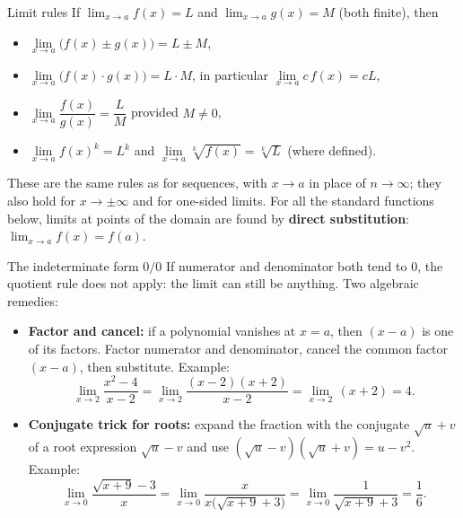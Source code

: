 \begin{rulebox}{Limit rules}
If $\lim_{x\to a}f(x)=L$ and $\lim_{x\to a}g(x)=M$ (both finite), then
\begin{itemize}[leftmargin=1.6em,itemsep=0.3ex]
  \item $\lim\limits_{x\to a}\bigl(f(x)\pm g(x)\bigr)=L\pm M$,
  \item $\lim\limits_{x\to a}\bigl(f(x)\cdot g(x)\bigr)=L\cdot M$,
        \quad in particular $\lim\limits_{x\to a}c\,f(x)=cL$,
  \item $\lim\limits_{x\to a}\dfrac{f(x)}{g(x)}=\dfrac{L}{M}$ \quad
        provided $M\neq 0$,
  \item $\lim\limits_{x\to a}f(x)^{k}=L^{k}$ and
        $\lim\limits_{x\to a}\sqrt[k]{f(x)}=\sqrt[k]{L}$ (where defined).
\end{itemize}
These are the same rules as for sequences, with $x\to a$ in place of
$n\to\infty$; they also hold for $x\to\pm\infty$ and for one-sided limits.
For all the standard functions below, limits at points of the domain are
found by \textbf{direct substitution}: $\lim_{x\to a}f(x)=f(a)$.
\end{rulebox}

\begin{rulebox}{The indeterminate form $0/0$}
If numerator and denominator both tend to $0$, the quotient rule does not
apply: the limit can still be anything. Two algebraic remedies:
\begin{itemize}[leftmargin=1.6em,itemsep=0.3ex]
  \item \textbf{Factor and cancel:} if a polynomial vanishes at $x=a$,
        then $(x-a)$ is one of its factors. Factor numerator and
        denominator, cancel the common factor $(x-a)$, then substitute.
        Example:
        \[
          \lim_{x\to 2}\frac{x^{2}-4}{x-2}
          =\lim_{x\to 2}\frac{(x-2)(x+2)}{x-2}
          =\lim_{x\to 2}\,(x+2)=4 .
        \]
  \item \textbf{Conjugate trick for roots:} expand the fraction with the
        conjugate $\sqrt{u}+v$ of a root expression $\sqrt{u}-v$ and use
        $(\sqrt{u}-v)(\sqrt{u}+v)=u-v^{2}$. Example:
        \[
          \lim_{x\to 0}\frac{\sqrt{x+9}-3}{x}
          =\lim_{x\to 0}\frac{x}{x\bigl(\sqrt{x+9}+3\bigr)}
          =\lim_{x\to 0}\frac{1}{\sqrt{x+9}+3}=\frac{1}{6} .
        \]
\end{itemize}
\end{rulebox}

